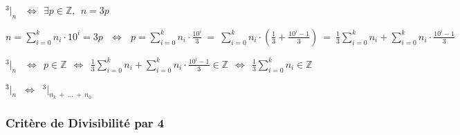 \documentclass[a4paper, twoside]{article}
\begin{document}
	\begin{center}
		{\LARGE $^3|_n$} $ ~~ \Longleftrightarrow ~~ \exists p \in \mathbb{Z}, ~~ n = 3p $\\
		
		\vspace{2mm}
			
		{\normalsize $ n = \sum\limits_{i=0}^k n_i \cdot 10^i = 3p ~~~ \Longleftrightarrow ~~~ p = \sum\limits_{i=0}^k n_i \cdot \frac{10^i}{3} ~ = ~ \sum\limits_{i=0}^k n_i \cdot \left( \frac{1}{3} + \frac{10^i-1}{3} \right) ~ = ~ \frac{1}{3} \sum\limits_{i=0}^k n_i + \sum\limits_{i=0}^k n_i \cdot \frac{10^i-1}{3}$}\\
		
		\vspace{2mm}
			
		{\Large $^3|_n$} {\normalsize $ ~~ \Longleftrightarrow ~~ p \in \mathbb{Z} ~~ \Longleftrightarrow ~~ \frac{1}{3}\sum\limits_{i=0}^k n_i + \sum\limits_{i=0}^k n_i \cdot \frac{10^i-1}{3} \in \mathbb{Z} ~~ \Longleftrightarrow ~~ \frac{1}{3}\sum\limits_{i=0}^k n_i \in \mathbb{Z}$ }
		
		\vspace{3mm}	
		
		{\LARGE $^3|_n$} $~ \Longleftrightarrow ~$ {\LARGE $^3|_{n_k ~ + ~ \dots ~ + ~ n_0}$}
		
	\end{center}



	\subsubsection*{Critère de Divisibilité par 4}
\end{document}
